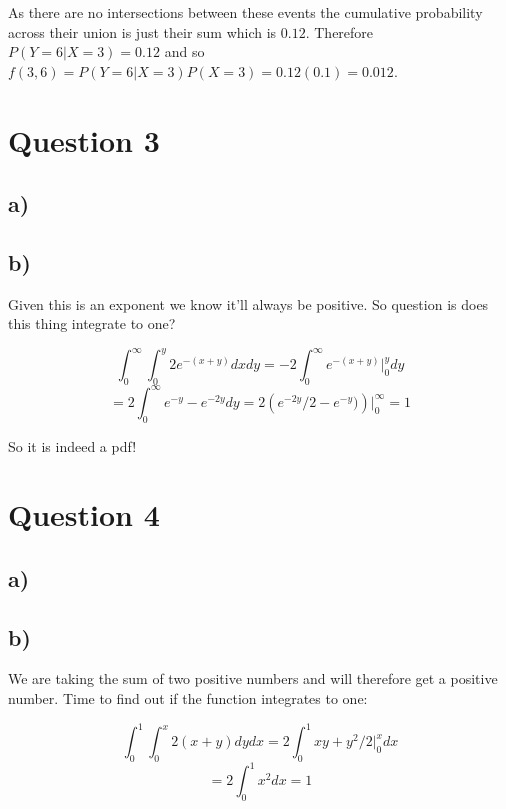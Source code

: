 \documentclass[11pt]{article}
\begin{document}
As there are no intersections between these events the cumulative probability across their union is just their sum which is $0.12$. Therefore $P(Y=6 | X=3)=0.12$ and so $f(3,6)=P(Y=6 | X=3)P(X=3)=0.12(0.1)=0.012$. 

\section*{Question 3}

\subsection*{a)}

\subsection*{b)}

Given this is an exponent we know it'll always be positive. So question is does this thing integrate to one?

$$\int_0^{\infty}\int_0^{y}2e^{-(x+y)} dxdy=-2\int_0^{\infty}e^{-(x+y)} \Big|_0^y dy$$
$$=2\int_0^{\infty}e^{-y}-e^{-2y} dy=2\left(e^{-2y}/2-e^{-y}) \right)\Big|_0^{\infty}=1$$

So it is indeed a pdf!

\section*{Question 4}
\subsection*{a)}

\subsection*{b)}

We are taking the sum of two positive numbers and will therefore get a positive number. Time to find out if the function integrates to one:

$$\int_0^1 \int_0^x2(x+y)dydx=2\int_0^1xy+y^2/2\Big|_0^x dx$$
$$=2\int_0^1 x^2dx=1$$
\end{document}
